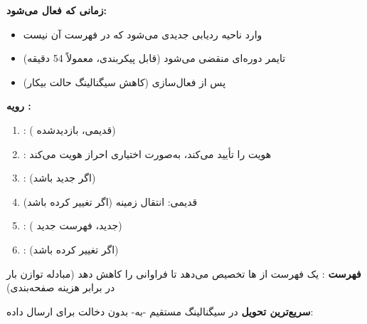 \textbf{زمانی که  فعال می‌شود:}

\begin{itemize}
\tightlist
\item
   وارد ناحیه ردیابی  جدیدی می‌شود که در فهرست  آن نیست
\item
  تایمر  دوره‌ای منقضی می‌شود (قابل پیکربندی، معمولاً 54 دقیقه)
\item
  پس از فعال‌سازی  (کاهش سیگنالینگ حالت بیکار)
\end{itemize}

\textbf{رویه :}

\begin{enumerate}
\def\labelenumi{\arabic{enumi}.}
\tightlist
\item
  :  ( قدیمی،  بازدیدشده)
\item
  : هویت را تأیید می‌کند، به‌صورت اختیاری احراز هویت می‌کند
\item
  :  (اگر  جدید باشد)
\item
   قدیمی: انتقال زمینه (اگر  تغییر کرده باشد)
\item
  :  ( جدید، فهرست  جدید)
\item
  :  (اگر  تغییر کرده باشد)
\end{enumerate}

\textbf{فهرست }:  یک فهرست از ها تخصیص می‌دهد تا فراوانی  را کاهش دهد (مبادله توازن بار در برابر هزینه صفحه‌بندی)


\textbf{سریع‌ترین تحویل} در   سیگنالینگ مستقیم -به- بدون دخالت  برای ارسال داده:


